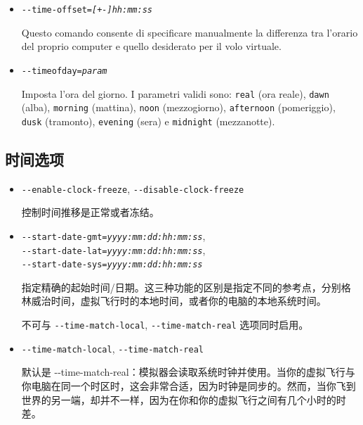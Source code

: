 \begin{itemize}
{\begin{itemize}
  Incompatibile con \texttt{-$ $-start-date-gmt}, \texttt{-$ $-start-date-lat}, \texttt{-$ $-start-date-sys}.

  \item{\texttt{-$ $-time-offset={\it [+-]hh:mm:ss}}}

  Questo comando consente di specificare manualmente la differenza tra
  l'orario del proprio computer e quello desiderato per il volo virtuale.

  \item{\texttt{-$ $-timeofday={\it param}}}

  Imposta l'ora del giorno. I parametri validi sono: \texttt{real} (ora reale),
  \texttt{dawn} (alba), \texttt{morning} (mattina),
  \texttt{noon} (mezzogiorno), \texttt{afternoon} (pomeriggio),
  \texttt{dusk} (tramonto), \texttt{evening} (sera) e \texttt{midnight} (mezzanotte).

  \end{itemize}
}
\ifchinese
{
  \subsection{时间选项}
\begin{itemize}

  \item{\texttt{-$ $-enable-clock-freeze}, \texttt{-$ $-disable-clock-freeze}}

   控制时间推移是正常或者冻结。
 
\item{\texttt{-$ $-start-date-gmt={\it yyyy:mm:dd:hh:mm:ss}},\\
  \texttt{-$ $-start-date-lat={\it yyyy:mm:dd:hh:mm:ss}},\\
  \texttt{-$ $-start-date-sys={\it yyyy:mm:dd:hh:mm:ss}}}

  指定精确的起始时间/日期。这三种功能的区别是指定不同的参考点，分别格林威治时间，虚拟飞行时的本地时间，或者你的电脑的本地系统时间。

  不可与 \texttt{-$ $-time-match-local}, \texttt{-$ $-time-match-real} 选项同时启用。

\item{\texttt{-$ $-time-match-local}, \texttt{-$ $-time-match-real}}

  默认是 {-$ $-time-match-real}：模拟器会读取系统时钟并使用。当你的虚拟飞行与你电脑在同一个时区时，这会非常合适，因为时钟是同步的。然而，当你飞到世界的另一端，却并不一样，因为在你和你的虚拟飞行之间有几个小时的时差。


\end{itemize}}
\end{itemize}
